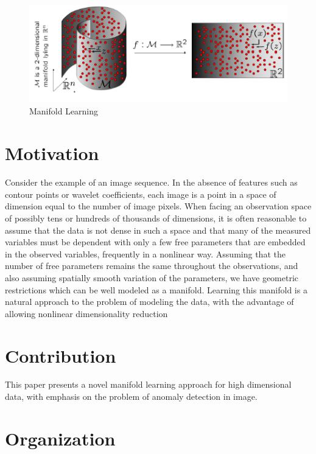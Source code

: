 \begin{figure}[ht]
\begin{center}
\includegraphics[width=\textwidth]{./Figures/manifold.png}
\caption{Manifold Learning \citep{Ety2008}}
\label{fig:manifold}
\end{center}
\end{figure}



\section{Motivation}
Consider the example of an image sequence. In the absence of features such as contour
points or wavelet coefficients, each image is a point in a space of dimension equal
to the number of image pixels. When facing an observation space of possibly tens or
hundreds of thousands of dimensions, it is often reasonable to assume that the data is not
dense in such a space and that many of the measured variables must be dependent with
only a few free parameters that are embedded in the observed variables, frequently in a
nonlinear way. Assuming that the number of free parameters remains the same throughout
the observations, and also assuming spatially smooth variation of the parameters,
we have geometric restrictions which can be well modeled as a manifold. Learning this manifold is a natural approach to the problem of modeling the data, with the advantage
of allowing nonlinear dimensionality reduction

\section{Contribution}
This paper presents a novel manifold learning approach for high dimensional
data, with emphasis on the problem of anomaly detection in image.

\section{Organization}




 



